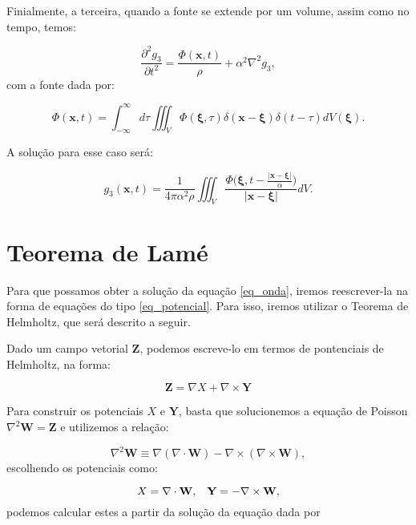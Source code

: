 \documentclass[a4paper,10pt]{article}
\begin{document}
Finialmente, a terceira, quando a fonte se extende por um volume, assim como no tempo, temos:

\begin{equation}
 \frac{\partial^2g_3}{\partial{t}^2} = \frac{\Phi(\mathbf{x},t)}{\rho} + \alpha^2\nabla^2g_3,
 \label{eq_potencial}
\end{equation}
com a fonte dada por:

\begin{equation}
 \Phi(\mathbf{x},t) = \int_{-\infty}^{\infty}d\tau\iiint_V\Phi(\mathbf{\xi},\tau)\delta(\mathbf{x}-\mathbf{\xi})\delta(t-\tau)dV(\mathbf{\xi}).
\end{equation}

A solução para esse caso será:

\begin{equation}
 g_3(\mathbf{x},t) =  \frac{1}{4\pi \alpha^2\rho}\iiint_V\frac{\Phi\Big(\mathbf{\xi},t - \frac{|\mathbf{x}-\mathbf{\xi}|}{\alpha}\Big)}{|\mathbf{x}-\mathbf{\xi}|}dV.
\end{equation}


\section{Teorema de Lamé}

Para que possamos obter a solução da equação \ref{eq_onda}, iremos reescrever-la na forma de equações do tipo \ref{eq_potencial}. Para isso, iremos utilizar o Teorema de Helmholtz, que será descrito a seguir.

Dado um campo vetorial $\mathbf{Z}$, podemos escreve-lo em termos de pontenciais de Helmholtz, na forma:

\begin{equation}
 \mathbf{Z} = \nabla{X} + \nabla\times\mathbf{Y}
\end{equation}

Para construir os potenciais $X$ e $\mathbf{Y}$, basta que solucionemos a equação de Poisson $\nabla^2\mathbf{W} = \mathbf{Z}$ e utilizemos a relação:

\begin{equation}
 \nabla^2\mathbf{W} \equiv \nabla(\nabla\cdot{\mathbf{W}}) - \nabla\times(\nabla\times\mathbf{W}),
\end{equation}
escolhendo os potenciais como:

\begin{equation}
 X = \nabla\cdot\mathbf{W}, \hspace{0.3cm} \mathbf{Y} = -\nabla\times\mathbf{W},
\end{equation}
podemos calcular estes a partir da solução da equação dada por
\end{document}
